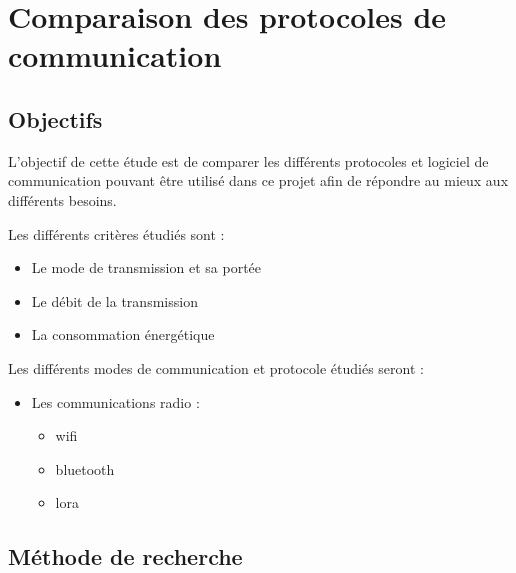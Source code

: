 \section{Comparaison des protocoles de communication}
\label{sec:comparaisonProtocoleCommnunication}

\subsection{Objectifs}
\label{sec:comparaisonProtocoleCommnunicationObjectifs}

L'objectif de cette étude est de comparer les différents protocoles et logiciel de communication
pouvant être utilisé dans ce projet afin de répondre au mieux aux différents besoins.\newline

Les différents critères étudiés sont :

\begin{itemize}
    \item Le mode de transmission et sa portée
    \item Le débit de la transmission
    \item La consommation énergétique
\end{itemize}

Les différents modes de communication et protocole étudiés seront :

\begin{itemize}
    \item Les communications radio :
          \begin{itemize}
              \item \gls{wifi}
              \item \gls{bluetooth}
              \item \gls{lora}
          \end{itemize}
\end{itemize}

\subsection{Méthode de recherche}
\label{sec:comparaisonProtocoleCommnunicationMethode}


